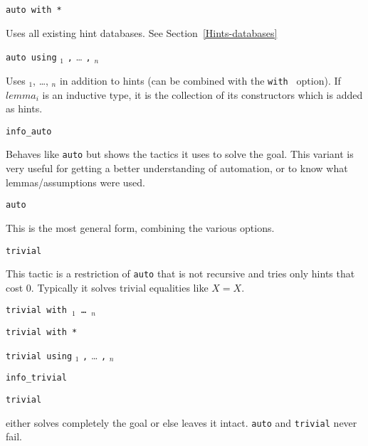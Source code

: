 \begin{coq_example*}
\begin{Variants}
\item {\tt auto with *}

  Uses all existing hint databases. See Section~\ref{Hints-databases}

\item \texttt{auto using} $_1$ {\tt ,} {\ldots} {\tt ,} $_n$

  Uses $_1$, \ldots, $_n$ in addition to
  hints (can be combined with the \texttt{with \ident} option). If
  $lemma_i$ is an inductive type, it is the collection of its
  constructors which is added as hints.

\item {\tt info\_auto}

  Behaves like {\tt auto} but shows the tactics it uses to solve the goal.
  This variant is very useful for getting a better understanding of automation,
  or to know what lemmas/assumptions were used.

\item {\tt {}auto \zeroone{\num}}  

  This is the most general form, combining the various options.

\item {\tt trivial}

  This tactic is a restriction of {\tt auto} that is not recursive and
  tries only hints that cost 0. Typically it solves trivial
  equalities like $X=X$.

\item \texttt{trivial with \ident$_1$ \dots\ \ident$_n$}

\item \texttt{trivial with *}

\item \texttt{trivial using} $_1$ {\tt ,} {\ldots} {\tt ,} $_n$

\item {\tt info\_trivial}

\item {\tt {}trivial}  

\end{Variants}

 either solves completely the goal or else leaves it
intact. \texttt{auto} and \texttt{trivial} never fail.


\end{coq_example*}
